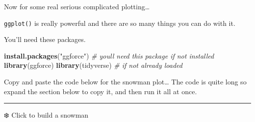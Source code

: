 \documentclass[
]{book}
\newenvironment{Shaded}{\begin{snugshade}}{\end{snugshade}}
\newcommand{\CommentTok}[1]{\textcolor[rgb]{0.56,0.35,0.01}{\textit{#1}}}
\newcommand{\FunctionTok}[1]{\textcolor[rgb]{0.13,0.29,0.53}{\textbf{#1}}}
\newcommand{\NormalTok}[1]{#1}
\newcommand{\StringTok}[1]{\textcolor[rgb]{0.31,0.60,0.02}{#1}}
\begin{document}
Now for some real serious complicated plotting\ldots{}

\texttt{ggplot()} is really powerful and there are so many things you can do with it.

You'll need these packages.

\begin{Shaded}
\begin{Highlighting}[]
\FunctionTok{install.packages}\NormalTok{(}\StringTok{"ggforce"}\NormalTok{) }\CommentTok{\# you\textquotesingle{}ll need this package if not installed}
\FunctionTok{library}\NormalTok{(ggforce)}
\FunctionTok{library}\NormalTok{(tidyverse) }\CommentTok{\# if not already loaded}
\end{Highlighting}
\end{Shaded}

Copy and paste the code below for the snowman plot\ldots{}
The code is quite long so expand the section below to copy it, and then run it all at once.

\begin{center}\rule{0.5\linewidth}{0.5pt}\end{center}

❄️ Click to build a snowman
\end{document}
